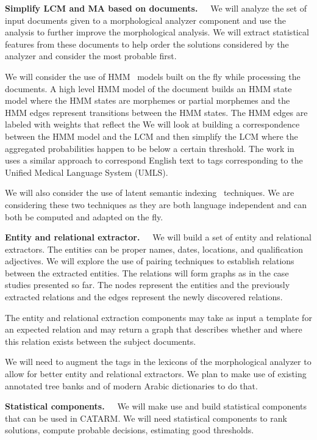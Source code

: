 \documentclass[12pt]{article}
\begin{document}
{\bf Simplify LCM and MA based on documents.~~}
We will analyze the set of input documents given to a
morphological analyzer component and use the analysis
to further improve the morphological analysis. 
We will extract statistical features from these documents 
to help order the solutions considered by the analyzer
and consider the most probable first. 

We will consider the use of HMM~\cite{JanHMM06}
models built on the fly while processing the documents.
A high level HMM model of the document builds an HMM state
model where the HMM states are morphemes or partial 
morphemes and the HMM edges represent transitions between
the HMM states. 
The HMM edges are labeled with weights that reflect the
We will look at building a correspondence between 
the HMM model and the LCM and then simplify the 
LCM where the aggregated probabilities happen to be
below a certain threshold. 
The work in~\cite{JanHMM06} uses a similar approach
to correspond English text to tags corresponding to the 
Unified Medical Language System (UMLS).

We will also consider the use of
latent semantic indexing~\cite{LSI89} techniques. 
We are considering these two techniques as they are 
both language independent and can both be computed and
adapted on the fly.

{\bf Entity and relational extractor.~~}
We will build a set of entity and relational extractors. 
The entities can be proper names, dates, locations,
and qualification adjectives. 
We will explore the use of pairing techniques to establish 
relations between the extracted entities.
The relations will form graphs as in the case studies presented
so far. The nodes represent the entities and the previously 
extracted relations and the edges represent the newly discovered 
relations.

The entity and relational extraction components 
may take as input a template for an expected relation and 
may return a graph that describes whether and where 
this relation exists between the subject documents.

We will need to augment the tags in the lexicons of the 
morphological analyzer to allow for better entity and relational
extractors. 
We plan to make use of existing annotated tree banks and of
modern Arabic dictionaries to do that. 

{\bf Statistical components.~~}
We will make use and build statistical components that can be used
in CATARM. 
We will need statistical components to rank solutions, compute 
probable decisions, estimating good thresholds. 
\end{document}
